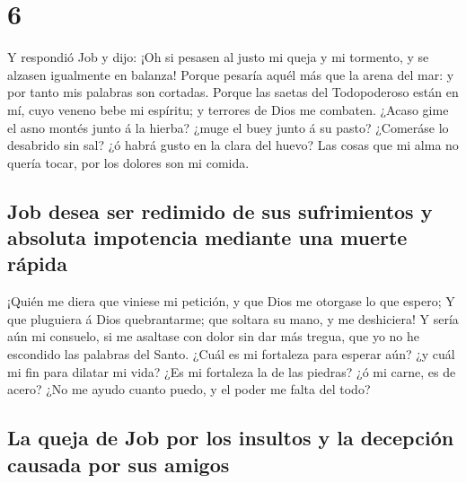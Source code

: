 \hypertarget{section-5}{%
\section{6}\label{section-5}}

 Y respondió Job y dijo:  ¡Oh si pesasen al
justo mi queja y mi tormento, y se alzasen igualmente en balanza!
 Porque pesaría aquél más que la arena del mar: y por
tanto mis palabras son cortadas.  Porque las saetas del
Todopoderoso están en mí, cuyo veneno bebe mi espíritu; y terrores de
Dios me combaten.  ¿Acaso gime el asno montés junto á la
hierba? ¿muge el buey junto á su pasto?  ¿Comeráse lo
desabrido sin sal? ¿ó habrá gusto en la clara del huevo? 
Las cosas que mi alma no quería tocar, por los dolores son mi comida.

\hypertarget{job-desea-ser-redimido-de-sus-sufrimientos-y-absoluta-impotencia-mediante-una-muerte-ruxe1pida}{%
\subsection{Job desea ser redimido de sus sufrimientos y absoluta
impotencia mediante una muerte
rápida}\label{job-desea-ser-redimido-de-sus-sufrimientos-y-absoluta-impotencia-mediante-una-muerte-ruxe1pida}}

 ¡Quién me diera que viniese mi petición, y que Dios me
otorgase lo que espero;  Y que pluguiera á Dios
quebrantarme; que soltara su mano, y me deshiciera!  Y
sería aún mi consuelo, si me asaltase con dolor sin dar más tregua, que
yo no he escondido las palabras del Santo.  ¿Cuál es mi
fortaleza para esperar aún? ¿y cuál mi fin para dilatar mi vida?
 ¿Es mi fortaleza la de las piedras? ¿ó mi carne, es de
acero?  ¿No me ayudo cuanto puedo, y el poder me falta
del todo?

\hypertarget{la-queja-de-job-por-los-insultos-y-la-decepciuxf3n-causada-por-sus-amigos}{%
\subsection{La queja de Job por los insultos y la decepción causada por
sus
amigos}\label{la-queja-de-job-por-los-insultos-y-la-decepciuxf3n-causada-por-sus-amigos}}

